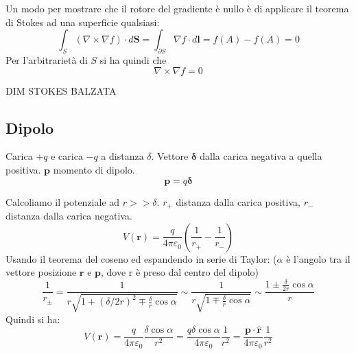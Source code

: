\documentclass{article}
\renewcommand{\epsilon}{\varepsilon}
\newcommand{\mbf}{\mathbf}
\newcommand{\vers}[1]{\mbf{\hat #1 }}
\newcommand{\qpe}[1][1]{ \frac{ #1 }{ 4\pi\epsilon_0 } }
\numberwithin{equation}{section}
\begin{document}
Un modo per mostrare che il rotore del gradiente è nullo è di applicare il teorema di Stokes ad una superficie qualsiasi:
\begin{equation}
    \int_S ( \nabla \times \nabla f ) \cdot d \mbf S = \int_{\partial S} \nabla f \cdot d \mbf l = f(A) - f(A) = 0
\end{equation}
Per l'arbitrarietà di $S$ si ha quindi che
\begin{equation}
    \nabla \times \nabla f = 0
\end{equation}

DIM STOKES BALZATA


\subsection{Dipolo} %
\label{sub:dipolo}

Carica $+q$ e carica $-q$ a distanza $\delta$. Vettore $\pmb \delta$ dalla carica negativa a quella positiva. $\mbf p$ momento di dipolo.
\begin{equation}
    \mbf p = q \pmb \delta
\end{equation}

Calcoliamo il potenziale ad $r >> \delta$. $r_+$ distanza dalla carica positiva, $r_-$ distanza dalla carica negativa. 
\begin{equation}
    V(\mbf r) = \qpe[q] \left ( \frac{ 1 }{ r_+ } - \frac{ 1 }{ r_- }  \right )
\end{equation}
Usando il teorema del coseno ed espandendo in serie di Taylor: ($\alpha$ è l'angolo tra il vettore posizione $\mbf r$ e $\mbf p$, dove r è preso dal centro del dipolo)
\begin{equation}
    \frac{ 1 }{ r_\pm } 
        = \frac{ 1 }{ r \sqrt{ 1 + (\delta/2r)^2 \mp \frac{\delta}{r} \cos \alpha} } 
        \sim \frac{ 1 }{ r \sqrt{ 1 \mp \frac{\delta}{r} \cos \alpha} } 
        \sim \frac{ 1 \pm \frac{\delta}{2r} \cos \alpha }{ r } 
\end{equation}
Quindi si ha:
\begin{equation}
    V(\mbf r) 
        = \qpe[q] \frac{ \delta \cos \alpha }{ r^2 } 
        = \qpe[q \delta \cos \alpha] \frac{ 1 }{ r^2 } 
        = \qpe[\mbf p \cdot \vers r] \frac{ 1 }{ r^2 } 
\end{equation}
\end{document}
